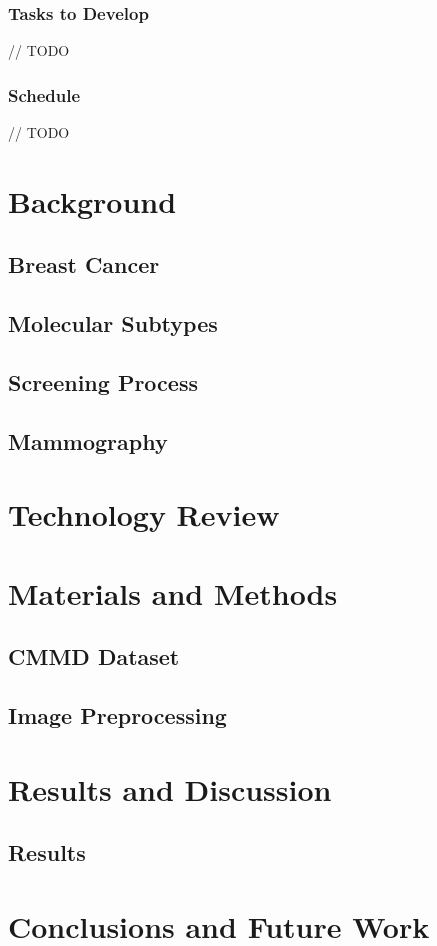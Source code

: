 \documentclass[a4paper,10pt]{book}
\begin{document}
\subsection{Tasks to Develop}

// TODO

\subsection{Schedule}

// TODO


\chapter{Background}
\section{Breast Cancer}
\section{Molecular Subtypes}
\section{Screening Process}
\section{Mammography}

\chapter{Technology Review}

\chapter{Materials and Methods}
\section{CMMD Dataset}
\section{Image Preprocessing}

\chapter{Results and Discussion}
\section{Results}

\chapter{Conclusions and Future Work}

\backmatter
{}


\end{document}

